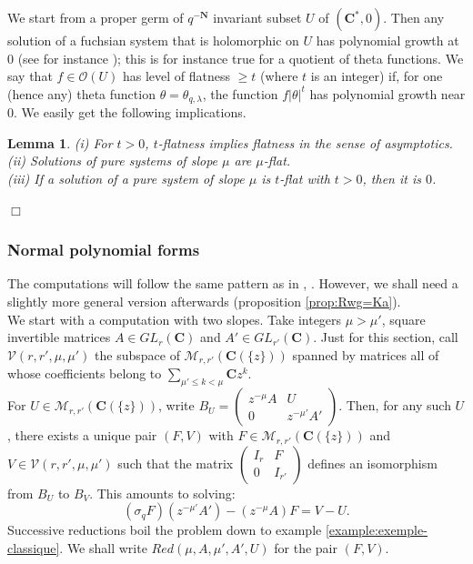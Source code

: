 \documentclass[english]{smfart}
\newtheorem{lemma}[thm]{Lemma}
\numberwithin{equation}{thm}
\def\sq{\sigma_q}
\def\C{{\mathbf C}}
\def\N{{\mathbf N}}
\def\O{{\mathcal{O}}}
\def\M{{\mathcal{M}}}
\def\VV{{\mathcal{V}}}
\def\Ka{{\C(\{z\})}}
\def\l{\left}
\def\r{\right}
\def\la{\lambda}
\def\th{\theta}
\begin{document}
We start from a proper germ of $q^{-\N}$ invariant subset $U$
of $(\C^{*},0)$. Then any solution of a fuchsian system that is
holomorphic on $U$ has polynomial growth at $0$ (see for instance 
\cite{JSGAL}); this is for instance true for a quotient of theta 
functions. We say that $f \in \O(U)$ has level of flatness $\geq t$ 
(where $t$ is an integer)
if, for one (hence any) theta function $\th = \th_{q,\la}$, the
function $f |\th|^{t}$ has polynomial growth near $0$. 
We easily get the following implications.

\begin{lemma} \label{lemma:flatness}
(i) For $t > 0$, $t$-flatness implies flatness in the sense
of asymptotics. \\
(ii) Solutions of pure systems of slope $\mu$ are $\mu$-flat. \\
(iii) If a solution of a pure system of slope $\mu$ is $t$-flat
with $t > 0$, then it is $0$.
\end{lemma}

\hfill $\Box$

\subsubsection*{Normal polynomial forms}

The computations will follow the same pattern as in \cite{RSZ},
\cite{RSZcras1}. However, we shall need a slightly more general 
version afterwards (proposition \ref{prop:Rwg=Ka}). \\

We start with a computation with two slopes. Take integers 
$\mu > \mu'$, square invertible matrices
$A \in GL_{r}(\C)$ and $A' \in GL_{r'}(\C)$. 
Just for this section, call $\VV(r,r',\mu,\mu')$
the subspace of $\M_{r,r'}(\Ka)$ spanned by matrices
all of whose coefficients belong to 
$\underset{\mu' \leq k < \mu}{\sum} \C z^{k}$. \\

For $U \in \M_{r,r'}(\Ka)$, write 
$B_{U} = \begin{pmatrix} z^{-\mu} A & U \\ 0 & z^{-\mu'} A' \end{pmatrix}$.
Then, for any such $U$, there exists a unique pair $(F,V)$ with 
$F \in \M_{r,r'}(\Ka)$ and $V \in \VV(r,r',\mu,\mu')$ 
such that the matrix
$\begin{pmatrix} I_{r} & F \\ 0 & I_{r'} \end{pmatrix}$
defines an isomorphism from $B_{U}$ to $B_{V}$.
This amounts to solving:
\begin{equation} \label{equation:equation-homologique}
\l(\sq F \r) (z^{-\mu'} A') - (z^{-\mu} A) F = V - U.
\end{equation}
Successive reductions boil the problem down to example
\ref{example:exemple-classique}. 
We shall write $Red(\mu,A,\mu',A',U)$ for the pair $(F,V)$. \\
\end{document}
